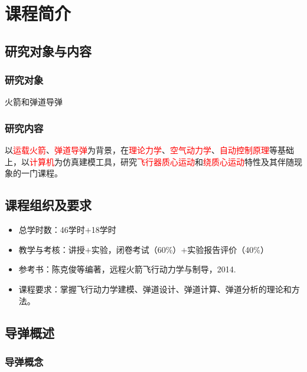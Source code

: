 \chapter{课程简介}
\section{研究对象与内容}
\subsection{研究对象}
火箭和弹道导弹\vspace*{1em}

\subsection{研究内容}
以\textcolor{red}{运载火箭}、\textcolor{red}{弹道导弹}为背景，在\textcolor{red}{理论力学}、\textcolor{red}{空气动力学}、\textcolor{red}{自动控制原理}等基础上，以\textcolor{red}{计算机}为仿真建模工具，研究\textcolor{red}{飞行器质心运动}和\textcolor{red}{绕质心运动}特性及其伴随现象的一门课程。

\section{课程组织及要求}
\begin{itemize}
	\item 总学时数：46学时$+$18学时\vspace*{-0.5em}
	\item 教学与考核：讲授$+$实验，闭卷考试（60\%）$+$实验报告评价（40\%）\vspace*{-0.5em}
	\item 参考书：陈克俊等编著，远程火箭飞行动力学与制导，2014.\vspace*{-0.5em}
	\item 课程要求：掌握飞行动力学建模、弹道设计、弹道计算、弹道分析的理论和方法。
\end{itemize}

\section{导弹概述}
\subsection{导弹概念}
\vspace*{-1em}

